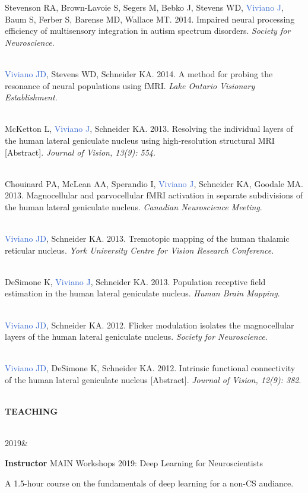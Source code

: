 \documentclass[a4paper,11pt,oneside]{book}
\newcommand{\entry}[4]{%
  \parbox[t]{3cm}{\hfill#1&}\hspace{1cm}\parbox[t]{10.65cm}{%
    \textbf{#2}%
    \hfill%
    {\footnotesize\addfontfeature{Color=lightgray} #3}\\%
    \begin{itemize}[leftmargin=0in]#4\end{itemize}\vspace{\parsep}%
  }}
\newcommand\sectionheading{
    \normalsize
    \noindent
    \leftskip=0in
    \textbf
}
\begin{document}
\begin{flushleft}
Stevenson RA, Brown-Lavoie S, Segers M, Bebko J, Stevens WD, \textcolor{highlight}{Viviano J}, Baum S, Ferber S, Barense MD, Wallace MT. 2014. Impaired neural processing efficiency of multisensory integration in autism spectrum disorders. \textit{Society for Neuroscience}. \\\

\textcolor{highlight}{Viviano JD}, Stevens WD, Schneider KA. 2014. A method for probing the resonance of neural populations using fMRI. \textit{Lake Ontario Visionary Establishment}. \\\

McKetton L, \textcolor{highlight}{Viviano J}, Schneider KA. 2013. Resolving the individual layers of the human lateral geniculate nucleus using high-resolution structural MRI [Abstract]. \textit{Journal of Vision, 13(9): 554}. \\\

Chouinard PA, McLean AA, Sperandio I, \textcolor{highlight}{Viviano J}, Schneider KA, Goodale MA. 2013. Magnocellular and parvocellular fMRI activation in separate subdivisions of the human lateral geniculate nucleus. \textit{Canadian Neuroscience Meeting}. \\\

\textcolor{highlight}{Viviano JD}, Schneider KA. 2013. Tremotopic mapping of the human thalamic reticular nucleus. \textit{York University Centre for Vision Research Conference}. \\\

DeSimone K, \textcolor{highlight}{Viviano J}, Schneider KA. 2013. Population receptive field estimation in the human lateral geniculate nucleus. \textit{Human Brain Mapping}. \\\

\textcolor{highlight}{Viviano JD}, Schneider KA. 2012. Flicker modulation isolates the magnocellular layers of the human lateral geniculate nucleus. \textit{Society for Neuroscience}. \\\

\textcolor{highlight}{Viviano JD}, DeSimone K, Schneider KA. 2012. Intrinsic functional connectivity of the human lateral geniculate nucleus [Abstract]. \textit{Journal of Vision, 12(9): 382}. \\\

\sectionheading{TEACHING} \\\

\entry
{2019}
{Instructor}
{MAIN Workshops 2019: Deep Learning for Neuroscientists}
{A 1.5-hour course on the fundamentals of deep learning for a non-CS audiance.}


\end{flushleft}
\end{document}
